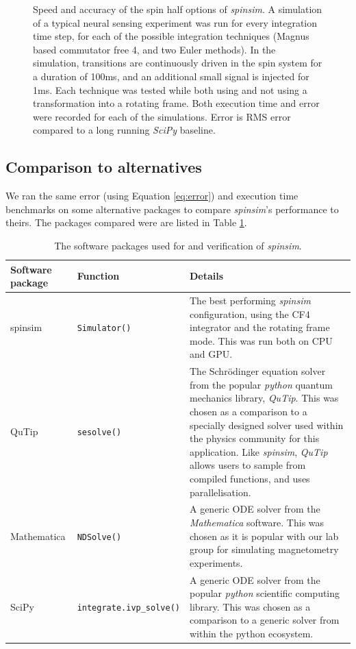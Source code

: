 \documentclass{jors}
\begin{document}
\begin{figure}[h!]
			\caption{Speed and accuracy of the spin half options of \emph{spinsim}.
			A simulation of a typical neural sensing experiment was run for every integration time step, for each of the possible integration techniques (Magnus based commutator free 4, and two Euler methods).
			In the simulation, transitions are continuously driven in the spin system for a duration of 100ms, and an additional small signal is injected for 1ms.
			Each technique was tested while both using and not using a transformation into a rotating frame.
			Both execution time and error were recorded for each of the simulations.
			Error is RMS error compared to a long running \emph{SciPy} baseline.}
			\label{fig:benchmark_spin_half}
		\end{figure}

	\subsection{Comparison to alternatives}
		We ran the same error (using Equation \eqref{eq:error}) and execution time benchmarks on some alternative packages to compare \emph{spinsim}'s performance to theirs.
		The packages compared were are listed in Table \ref{tab:external}.
		\begin{table}[h!]
			\caption{The software packages used for and verification of \emph{spinsim}.}
			\label{tab:external}
			\begin{tabular}{l|l|p{6.5cm}}
				\textbf{Software package}									&\textbf{Function}					&\textbf{Details}\\
				\hline
				spinsim														&\texttt{Simulator()}				&The best performing \emph{spinsim} configuration, using the CF4 integrator and the rotating frame mode. This was run both on CPU and GPU.
				\\
				\hline
				QuTip\cite{johansson_qutip_2013}							&\texttt{sesolve()}					&The Schr\"odinger equation solver from the popular \emph{python} quantum mechanics library, \emph{QuTip}.
				This was chosen as a comparison to a specially designed solver used within the physics community for this application.
				Like \emph{spinsim}, \emph{QuTip} allows users to sample from compiled functions, and uses parallelisation.\\
				\hline
				Mathematica\cite{wolfram_research_inc_mathematica_2020}	&\texttt{NDSolve()}					&A generic ODE solver from the \emph{Mathematica} software.
				This was chosen as it is popular with our lab group for simulating magnetometry experiments.\\
				\hline
				SciPy\cite{virtanen_scipy_2020}							&\texttt{integrate.ivp\_solve()}	&A generic ODE solver from the popular \emph{python} scientific computing library.
				This was chosen as a comparison to a generic solver from within the python ecosystem.
			\end{tabular}
		\end{table}
\end{document}
